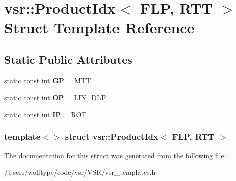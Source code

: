 \hypertarget{structvsr_1_1_product_idx_3_01_f_l_p_00_01_r_t_t_01_4}{\section{vsr\-:\-:Product\-Idx$<$ F\-L\-P, R\-T\-T $>$ Struct Template Reference}
\label{structvsr_1_1_product_idx_3_01_f_l_p_00_01_r_t_t_01_4}
}
\subsection*{Static Public Attributes}
\begin{DoxyCompactItemize}
\item 
\hypertarget{structvsr_1_1_product_idx_3_01_f_l_p_00_01_r_t_t_01_4_a1d89b3d1304ad02b27adc68ef825ac89}{static const int {\bfseries G\-P} = M\-T\-T}\label{structvsr_1_1_product_idx_3_01_f_l_p_00_01_r_t_t_01_4_a1d89b3d1304ad02b27adc68ef825ac89}

\item 
\hypertarget{structvsr_1_1_product_idx_3_01_f_l_p_00_01_r_t_t_01_4_a8c04ea1fee7fcf7dea594356e0f975d3}{static const int {\bfseries O\-P} = L\-I\-N\-\_\-\-D\-L\-P}\label{structvsr_1_1_product_idx_3_01_f_l_p_00_01_r_t_t_01_4_a8c04ea1fee7fcf7dea594356e0f975d3}

\item 
\hypertarget{structvsr_1_1_product_idx_3_01_f_l_p_00_01_r_t_t_01_4_a0863494250257aa99839504da78daa58}{static const int {\bfseries I\-P} = R\-O\-T}\label{structvsr_1_1_product_idx_3_01_f_l_p_00_01_r_t_t_01_4_a0863494250257aa99839504da78daa58}

\end{DoxyCompactItemize}
\subsubsection*{template$<$$>$ struct vsr\-::\-Product\-Idx$<$ F\-L\-P, R\-T\-T $>$}



The documentation for this struct was generated from the following file\-:\begin{DoxyCompactItemize}
\item 
/\-Users/wolftype/code/vsr/\-V\-S\-R/vsr\-\_\-templates.\-h\end{DoxyCompactItemize}

